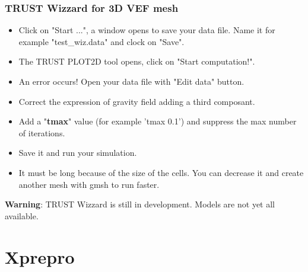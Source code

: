 \documentclass[10pt, hyperref={unicode=true,pdfusetitle, bookmarks=true,bookmarksnumbered=false,bookmarksopen=false, breaklinks=false,pdfborder={0 0 1},backref=true,colorlinks=true,linkcolor=darkblue,pageanchor}]{beamer}
\begin{document}
\begin{frame}
\frametitle{TRUST Wizzard for 3D VEF mesh}
\begin{block}{}

\begin{itemize}
\item Click on "Start ...", a window opens to save your data file. Name it for example "test\_wiz.data" and clock on "Save".
\item The TRUST PLOT2D tool opens, click on "Start computation!".
\item An error occurs! Open your data file with "Edit data" button.
\item Correct the expression of gravity field adding a third composant.
\item Add a "\textbf{tmax}" value (for example 'tmax 0.1') and suppress the max number of iterations.
\item Save it and run your simulation.
\item It must be long because of the size of the cells. You can decrease it and create another mesh with gmsh to run faster.
\end{itemize}
\textbf{Warning}: TRUST Wizzard is still in development. Models are not yet all available.
\end{block}
\end{frame}



\section{{\bf{Xprepro}}}
\end{document}
